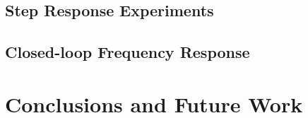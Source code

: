 \documentclass[11pt]{article}
\begin{document}

\subsection{Step Response Experiments}

\subsection{Closed-loop Frequency Response}


\section{Conclusions and Future Work}

\begin{thebibliography}{9}
\end{thebibliography}
\end{document}

